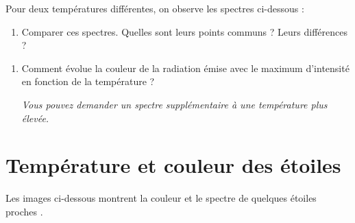 \documentclass[12pt,a4paper,fleqn]{article}
\newcommand{\thumbsup}{\marginpar{\faThumbsOUp}}
\begin{document}
Pour deux températures différentes, on observe les spectres ci-dessous :
\vspace{100pt}
\begin{enumerate}[resume]
\item \app{}

Comparer ces spectres.
Quelles sont leurs points communs ?
Leurs différences ?
\end{enumerate}

\begin{center}
\end{center}

\begin{enumerate}[resume]
\item \anarai{}

Comment évolue la couleur de la radiation émise avec le maximum d'intensité en fonction de la température ?

\textit{Vous pouvez demander un spectre supplémentaire à une température plus élevée.} \thumbsup{}
\end{enumerate}

\begin{center}
\end{center}

\section*{Température et couleur des étoiles}

Les images ci-dessous montrent la couleur et le spectre de quelques étoiles \og proches \fg{}.
\end{document}
